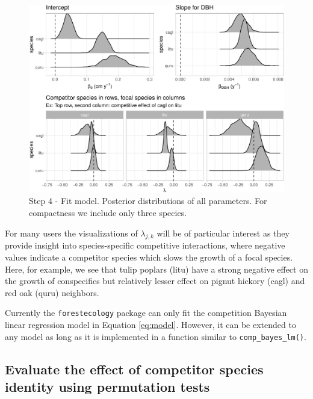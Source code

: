 \documentclass[12pt]{article}
\begin{document}
\begin{figure}

{\centering \includegraphics[width=1\linewidth]{Figures/scbi-posterior-viz-1} 

}

\caption{Step 4 - Fit model. Posterior distributions of all parameters. For compactness we include only three species.}\label{fig:scbi-posterior-viz}
\end{figure}

For many users the visualizations of \(\lambda_{j,k}\) will be of
particular interest as they provide insight into species-specific
competitive interactions, where negative values indicate a competitor
species which slows the growth of a focal species. Here, for example, we
see that tulip poplars (litu) have a strong negative effect on the
growth of conspecifics but relatively lesser effect on pignut hickory
(cagl) and red oak (quru) neighbors.

Currently the \texttt{forestecology} package can only fit the
competition Bayesian linear regression model in Equation \ref{eq:model}.
However, it can be extended to any model as long as it is implemented in
a function similar to \texttt{comp\_bayes\_lm()}.

\hypertarget{permutation-test}{%
\subsection{Evaluate the effect of competitor species identity using
permutation tests}\label{permutation-test}}
\end{document}
